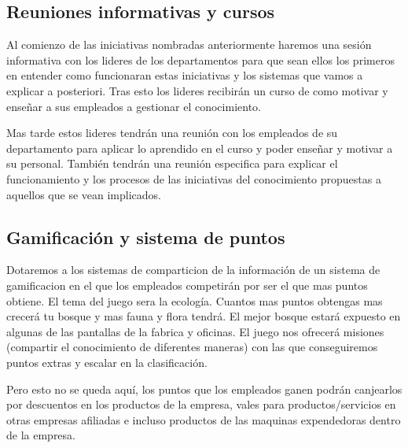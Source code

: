 \documentclass[twoside]{article}
\begin{document}
\subsection{Reuniones informativas y cursos}

Al comienzo de las iniciativas nombradas anteriormente haremos una sesión informativa con los lideres de los departamentos para que sean ellos los primeros en entender como funcionaran estas iniciativas y los sistemas que vamos a explicar a posteriori. Tras esto los lideres recibirán un curso de como motivar y enseñar a sus empleados a gestionar el conocimiento. \par
Mas tarde estos lideres tendrán una reunión con los empleados de su departamento para aplicar lo aprendido en el curso y poder enseñar y motivar a su personal. También tendrán una reunión especifica para explicar el funcionamiento y los procesos de las iniciativas del conocimiento propuestas a aquellos que se vean implicados.

\subsection{Gamificación y sistema de puntos}

Dotaremos a los sistemas de comparticion de la información de un sistema de gamificacion en el que los empleados competirán por ser el que mas puntos obtiene. El tema del juego sera la ecología. Cuantos mas puntos obtengas mas crecerá tu bosque y mas fauna y flora tendrá. El mejor bosque estará expuesto en algunas de las pantallas de la fabrica y oficinas. El juego nos ofrecerá misiones (compartir el conocimiento de diferentes maneras) con las que conseguiremos puntos extras y escalar en la clasificación.\par
Pero esto no se queda aquí, los puntos que los empleados ganen podrán canjearlos por descuentos en los productos de la empresa,  vales para productos/servicios en otras empresas afiliadas e incluso productos de las maquinas expendedoras dentro de la empresa.
\end{document}
